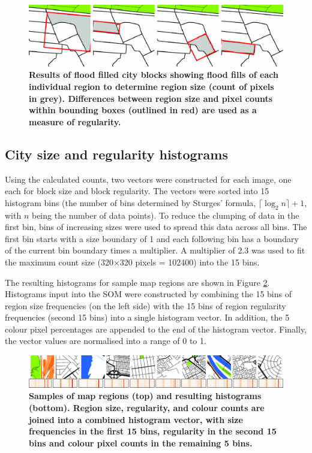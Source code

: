 \documentclass[9pt,twocolumn,twoside,lineno]{pnas-new}
\begin{document}
{\begin{figure}
\centering
 \includegraphics[width=.8\linewidth]{BlockTypologies_Figures2-5.png}
\caption{\bf Results of flood filled city blocks showing flood fills of each individual region to determine region size (count of pixels in grey). Differences between region size and pixel counts within bounding boxes (outlined in red) are used as a measure of regularity.}
 \label{fig:floodfilled}
\end{figure} 

\subsection*{City size and regularity histograms}\label{methodshist}

Using the calculated counts, two vectors were constructed for each image, one each for block size and block regularity. The vectors were sorted into 15 histogram bins (the number of bins determined by Sturges' formula\cite{Sturges1926}, $\lceil \log_{2}n \rceil +1$, with $n$ being the number of data points). To reduce the clumping of data in the first bin, bins of increasing sizes were used to spread this data across all bins. The first bin starts with a size boundary of 1 and each following bin has a boundary of the current bin boundary times a multiplier. A multiplier of 2.3 was used to fit the maximum count size (320$\times$320 pixels = 102400) into the 15 bins.

The resulting histograms for sample map regions are shown in Figure \ref{fig:mapsandHist}. Histograms input into the SOM were constructed by combining the 15 bins of region size frequencies (on the left side) with the 15 bins of region regularity frequencies (second 15 bins) into a single histogram vector. In addition, the 5 colour pixel percentages are appended to the end of the histogram vector. Finally, the vector values are normalised into a range of 0 to 1.


\begin{figure}
\centering
 \includegraphics[width=.8\linewidth]{BlockTypologies_Figures2-6.png}
\caption{\bf Samples of map regions (top) and resulting histograms (bottom). Region size, regularity, and colour counts are joined into a combined histogram vector, with size frequencies in the first 15 bins, regularity in the second 15 bins and colour pixel counts in the remaining 5 bins.}
 \label{fig:mapsandHist}
\end{figure} 

}
\end{document}
